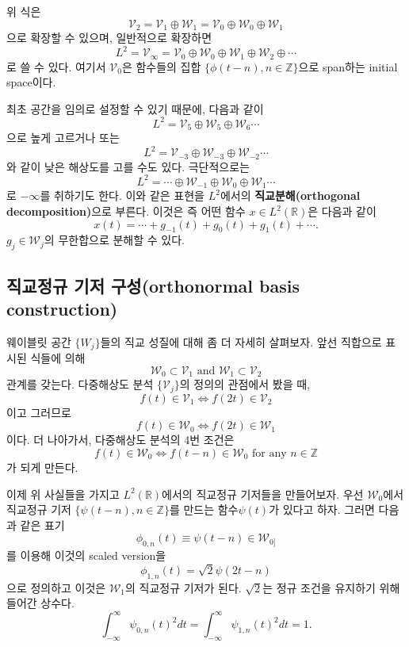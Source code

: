 \documentclass[b5paper,]{scrbook}
\theoremstyle{plain}
\theoremstyle{definition}
\numberwithin{equation}{section}
\begin{document}
위 식은
\[\mathcal{V}_{2}=\mathcal{V}_{1}\oplus\mathcal{W}_{1}=\mathcal{V}_{0}\oplus\mathcal{W}_{0}\oplus\mathcal{W}_{1}\]
으로 확장할 수 있으며, 일반적으로 확장하면
\[L^{2}=\mathcal{V}_{\infty}=\mathcal{V}_{0}\oplus \mathcal{W}_{0} \oplus \mathcal{W}_{1} \oplus \mathcal{W}_{2} \oplus \cdots\]
로 쓸 수 있다. 여기서 \(\mathcal{V}_{0}\)은 함수들의 집합
\(\{ \phi(t-n), n\in\mathbb{Z}\}\)으로 span하는 initial space이다.

최초 공간을 임의로 설정할 수 있기 때문에, 다음과 같이
\[L^{2}=\mathcal{V}_{5}\oplus \mathcal{W}_{5} \oplus \mathcal{W}_{6}\cdots\]
으로 높게 고르거나 또는
\[L^{2}=\mathcal{V}_{-3}\oplus \mathcal{W}_{-3} \oplus \mathcal{W}_{-2}\cdots\]
와 같이 낮은 해상도를 고를 수도 있다. 극단적으로는
\[L^{2}=\cdots\oplus \mathcal{W}_{-1} \oplus \mathcal{W}_{0} \oplus \mathcal{W}_{1}\cdots\]
로 \(-\infty\)를 취하기도 한다. 이와 같은 표현을 \(L^{2}\)에서의
\textbf{직교분해(orthogonal decomposition)}으로 부른다. 이것은 즉 어떤
함수 \(x\in L^{2}(\mathbb{R})\)은 다음과 같이
\[x(t)=\cdots + g_{-1}(t)+g_{0}(t)+g_{1}(t)+\cdots .\]
\(g_{j}\in\mathcal{W}_{j}\)의 무한합으로 분해할 수 있다.

\subsection{직교정규 기저 구성(orthonormal basis
construction)}\label{--orthonormal-basis-construction}

웨이블릿 공간 \(\{ W_{j} \}\)들의 직교 성질에 대해 좀 더 자세히
살펴보자. 앞선 직합으로 표시된 식들에 의해
\[\mathcal{W}_{0}\subset \mathcal{V}_{1} \text{ and } \mathcal{W}_{1} \subset \mathcal{V}_{2}\]
관계를 갖는다. 다중해상도 분석 \(\{\mathcal{V}_{j}\}\)의 정의의 관점에서
봤을 때,
\[f(t)\in \mathcal{V}_{1} \Longleftrightarrow f(2t)\in \mathcal{V}_{2}\]
이고 그러므로
\[f(t)\in \mathcal{W}_{0} \Longleftrightarrow f(2t)\in \mathcal{W}_{1}\]
이다. 더 나아가서, 다중해상도 분석의 4번 조건은
\[f(t)\in \mathcal{W}_{0} \Longleftrightarrow f(t-n)\in\mathcal{W}_{0} \text{ for any } n\in\mathbb{Z}\]
가 되게 만든다.

이제 위 사실들을 가지고 \(L^{2}(\mathbb{R})\)에서의 직교정규 기저들을
만들어보자. 우선 \(\mathcal{W}_{0}\)에서 직교정규 기저
\(\{\psi(t-n),n\in\mathbb{Z}\}\)를 만드는 함수\(\psi(t)\)가 있다고 하자.
그러면 다음과 같은 표기
\[\phi_{0,n}(t)\equiv\psi(t-n)\in\mathcal{W}_{0]}\] 를 이용해 이것의
scaled version을 \[\phi_{1,n}(t)=\sqrt{2}\psi(2t-n)\] 으로 정의하고
이것은 \(\mathcal{W}_{1}\)의 직교정규 기저가 된다. \(\sqrt{2}\)는 정규
조건을 유지하기 위해 들어간 상수다.
\[\int_{-\infty}^{\infty}\psi_{0,n}(t)^{2}dt=\int_{-\infty}^{\infty}\psi_{1,n}(t)^{2}dt=1.\]
\end{document}
